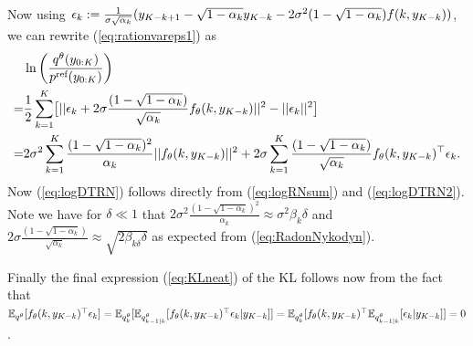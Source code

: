 \documentclass{article} %
\begin{document}
Now using ${{\epsilon}}_k:=\frac{1}{\sigma \sqrt{\alpha_k}}(y_{K-k+1}-\sqrt{1-\alpha_k}y_{K-k}-2\sigma^2(1-\sqrt{1-\alpha_k})f(k,y_{K-k}))$, we can rewrite (\ref{eq:rationvareps1}) as 
\begin{align}\label{eq:logDTRN2_2}
   &\operatorname{ln}  \left(\frac{q^{\theta}(y_{0:K})}{p^{\textup{ref}}(y_{0:K})}\right) \\
   =&\frac{1}{2} \sum_{k=1}^K \bigr[ ||{{\epsilon}}_k+2 \sigma \frac{(1-\sqrt{1-\alpha_k})}{\sqrt{\alpha_k}}f_\theta(k,y_{K-k})||^2 - ||{{\epsilon}}_k||^2 \bigr] \nonumber \\
    =&2 \sigma^2 \sum_{k=1}^K \frac{(1-\sqrt{1-\alpha_k})^2}{\alpha_k}||f_\theta(k,y_{K-k})||^2 +2 \sigma \sum_{k=1}^K \frac{(1-\sqrt{1-\alpha_k})}{\sqrt{\alpha_k}}f_\theta(k,y_{K-k})^\top {{\epsilon}}_k. \nonumber
\end{align}
Now (\ref{eq:logDTRN}) follows directly from (\ref{eq:logRNsum}) and (\ref{eq:logDTRN2}). Note we have for $\delta \ll 1$ that $2 \sigma^2 \frac{(1-\sqrt{1-\alpha_k})^2}{\alpha_k} \approx \sigma^2 \beta_k  \delta$ and $2 \sigma \frac{(1-\sqrt{1-\alpha_k})}{\sqrt{\alpha_k}} \approx \sqrt{2\beta_{k\delta} \delta}$ as expected from (\ref{eq:RadonNykodyn}).

Finally the final expression (\ref{eq:KLneat}) of the KL follows now from the fact that $\mathbb{E}_{q^\theta}[f_\theta(k,y_{K-k})^\top {{\epsilon}}_k]=\mathbb{E}_{q^\theta_{k}}[\mathbb{E}_{q^\theta_{k-1|k}}[f_\theta(k,y_{K-k})^\top {{\epsilon}}_k |y_{K-k}]]=\mathbb{E}_{q^\theta_{k}}[f_\theta(k,y_{K-k})^\top \mathbb{E}_{q^\theta_{k-1|k}}[ {{\epsilon}}_k |y_{K-k}]]=0$.
\end{document}
